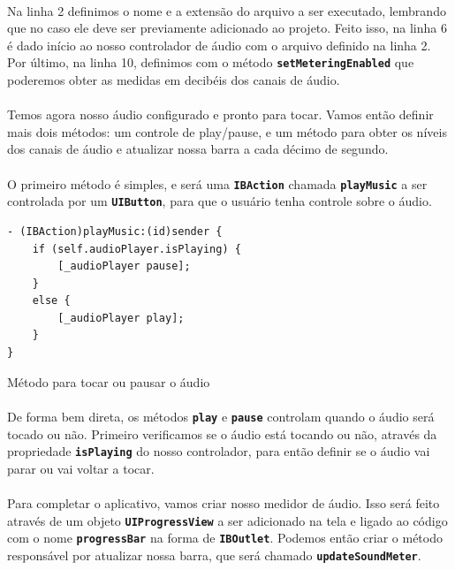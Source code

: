 \documentclass[a4paper,12pt,brazil,doubleside]{book}
\begin{document}
\begin{singlespace}
\paragraph{}Na linha 2 definimos o nome e a extensão do arquivo a ser executado, lembrando que no caso ele deve ser previamente adicionado ao projeto. Feito isso, na linha 6 é dado início ao nosso controlador de áudio com o arquivo definido na linha 2. Por último, na linha 10, definimos com o método \texttt{\textbf{setMeteringEnabled}} que poderemos obter as medidas em decibéis dos canais de áudio.
\paragraph{}Temos agora nosso áudio configurado e pronto para tocar. Vamos então definir mais dois métodos: um controle de play/pause, e um método para obter os níveis dos canais de áudio e atualizar nossa barra a cada décimo de segundo.
\paragraph{}O primeiro método é simples, e será uma \texttt{\textbf{IBAction}} chamada \texttt{\textbf{playMusic}} a ser controlada por um \texttt{\textbf{UIButton}}, para que o usuário tenha controle sobre o áudio.

\begin{listing}[H]
\begin{verbatim}
- (IBAction)playMusic:(id)sender {
    if (self.audioPlayer.isPlaying) {
        [_audioPlayer pause];
    }
    else {
        [_audioPlayer play];
    }
}
\end{verbatim}
\caption{Método para tocar ou pausar o áudio}
\end{listing}

\paragraph{}De forma bem direta, os métodos \texttt{\textbf{play}} e \texttt{\textbf{pause}} controlam quando o áudio será tocado ou não. Primeiro verificamos se o áudio está tocando ou não, através da propriedade \texttt{\textbf{isPlaying}} do nosso controlador, para então definir se o áudio vai parar ou vai voltar a tocar.
\paragraph{}Para completar o aplicativo, vamos criar nosso medidor de áudio. Isso será feito através de um objeto \texttt{\textbf{UIProgressView}} a ser adicionado na tela e ligado ao código com o nome \texttt{\textbf{progressBar}} na forma de \texttt{\textbf{IBOutlet}}. Podemos então criar o método responsável por atualizar nossa barra, que será chamado \texttt{\textbf{updateSoundMeter}}.


\end{singlespace}
\end{document}

